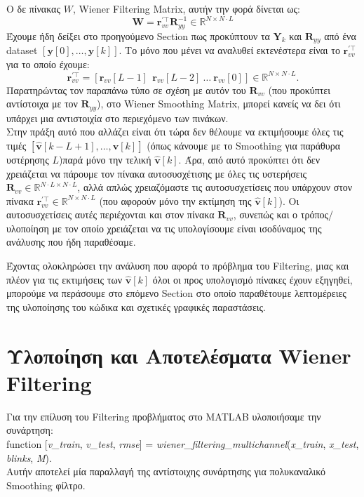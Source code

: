 \documentclass[12pt]{article} %
\begin{document}
Ο δε πίνακας $W$, Wiener Filtering Matrix, αυτήν την φορά δίνεται ως:
\[
\mathbf{W} = \mathbf{r}_{vv}^{' \top}\mathbf{R}_{yy}^{-1} \in \mathbb{R}^{N \times N \cdot L}
\]
Έχουμε ήδη δείξει στο προηγούμενο Section πως προκύπτουν τα $\mathbf{Y}_k$ και $\mathbf{R}_{yy}$ από ένα dataset $[\mathbf{y}[0], \ldots, \mathbf{y}[k]]$. Το μόνο που μένει να αναλυθεί εκτενέστερα είναι το $\mathbf{r}_{vv}^{' \top}$ για το οποίο έχουμε:
\[
\mathbf{r}_{vv}^{' \top} = [\mathbf{r}_{vv}[L-1]\ \ \mathbf{r}_{vv}[L-2] \  \ldots \ \mathbf{r}_{vv}[0]] \in \mathbb{R}^{N \times N \cdot L}.
\]
Παρατηρώντας τον παραπάνω τύπο σε σχέση με αυτόν του $\mathbf{R}_{vv}$ (που προκύπτει αντίστοιχα με τον $\mathbf{R}_{yy}$), στο Wiener Smoothing Matrix, μπορεί κανείς να δει ότι υπάρχει μια αντιστοιχία στο περιεχόμενο των πινάκων. \\ 
Στην πράξη αυτό που αλλάζει είναι ότι τώρα δεν θέλουμε να εκτιμήσουμε όλες τις τιμές $[\hat{\mathbf{v}}[k-L+1], \ldots, \hat{\mathbf{v}}[k]]$ (όπως κάνουμε με το Smoothing για παράθυρα υστέρησης $L$)\textemdash παρά μόνο την τελική $\hat{\mathbf{v}}[k]$. 
Άρα, από αυτό προκύπτει ότι δεν χρειάζεται να πάρουμε τον πίνακα αυτοσυσχέτισης με όλες τις υστερήσεις $\mathbf{R}_{vv} \in \mathbb{R}^{N \cdot L \times N \cdot L}$, αλλά απλώς χρειαζόμαστε τις αυτοσυσχετίσεις που υπάρχουν στον πίνακα $\mathbf{r}_{vv}^{' \top} \in \mathbb{R}^{N \times N \cdot L}$ (που αφορούν μόνο την εκτίμηση της $\hat{\mathbf{v}}[k]$).
Οι αυτοσυσχετίσεις αυτές περιέχονται και στον πίνακα $\mathbf{R}_{vv}$, συνεπώς και ο τρόπος/υλοποίηση με τον οποίο χρειάζεται να τις υπολογίσουμε είναι ισοδύναμος της ανάλυσης που ήδη παραθέσαμε. 

\vspace{+10pt}

Έχοντας ολοκληρώσει την ανάλυση που αφορά το πρόβλημα του Filtering, μιας και πλέον για τις εκτιμήσεις των $\hat{\mathbf{v}}[k]$ όλοι οι προς υπολογισμό πίνακες έχουν εξηγηθεί, μπορούμε να περάσουμε στο επόμενο Section στο οποίο παραθέτουμε λεπτομέρειες της υλοποίησης του κώδικα και σχετικές γραφικές παραστάσεις.

\section*{Υλοποίηση και Αποτελέσματα Wiener Filtering}

Για την επίλυση του Filtering προβλήματος στο MATLAB υλοποιήσαμε την συνάρτηση: \\
function [\textit{v\_train}, \textit{v\_test}, \textit{rmse}] = \textit{wiener\_filtering\_multichannel}(\textit{x\_train}, \textit{x\_test}, \textit{blinks}, \textit{M}). \\
Αυτήν αποτελεί μία παραλλαγή της αντίστοιχης συνάρτησης για πολυκαναλικό Smoothing φίλτρο. 
\end{document}
